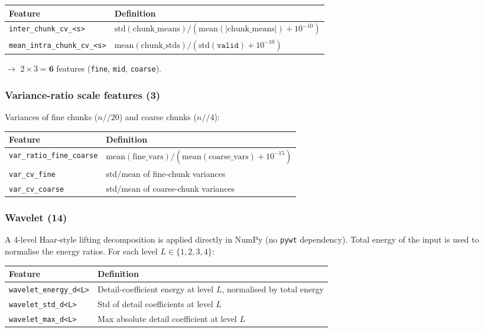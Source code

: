 \documentclass[11pt,a4paper]{article}
\begin{document}
\begin{tabular}{@{}lp{10cm}@{}}
\toprule
\textbf{Feature} & \textbf{Definition} \\
\midrule
\texttt{inter\_chunk\_cv\_<s>}      & $\mathrm{std}(\mathrm{chunk\_means}) / (\mathrm{mean}(|\mathrm{chunk\_means}|) + 10^{-10})$ \\
\texttt{mean\_intra\_chunk\_cv\_<s>}& $\mathrm{mean}(\mathrm{chunk\_stds}) / (\mathrm{std}(\texttt{valid}) + 10^{-10})$ \\
\bottomrule
\end{tabular}

$\rightarrow$ $2 \times 3 = \mathbf{6}$ features (\texttt{fine}, \texttt{mid},
\texttt{coarse}).

\subsubsection*{Variance-ratio scale features (3)}

Variances of fine chunks ($n // 20$) and coarse chunks ($n // 4$):

\begin{tabular}{@{}lp{10cm}@{}}
\toprule
\textbf{Feature} & \textbf{Definition} \\
\midrule
\texttt{var\_ratio\_fine\_coarse} & $\mathrm{mean}(\mathrm{fine\_vars}) / (\mathrm{mean}(\mathrm{coarse\_vars}) + 10^{-15})$ \\
\texttt{var\_cv\_fine}            & $\mathrm{std} / \mathrm{mean}$ of fine-chunk variances \\
\texttt{var\_cv\_coarse}          & $\mathrm{std} / \mathrm{mean}$ of coarse-chunk variances \\
\bottomrule
\end{tabular}

\subsubsection*{Wavelet (14)}

A 4-level Haar-style lifting decomposition is applied directly in NumPy
(no \texttt{pywt} dependency). Total energy of the input is used to
normalise the energy ratios. For each level $L \in \{1, 2, 3, 4\}$:

\begin{tabular}{@{}lp{10cm}@{}}
\toprule
\textbf{Feature} & \textbf{Definition} \\
\midrule
\texttt{wavelet\_energy\_d<L>} & Detail-coefficient energy at level $L$, normalised by total energy \\
\texttt{wavelet\_std\_d<L>}    & Std of detail coefficients at level $L$ \\
\texttt{wavelet\_max\_d<L>}    & Max absolute detail coefficient at level $L$ \\
\bottomrule
\end{tabular}
\end{document}
